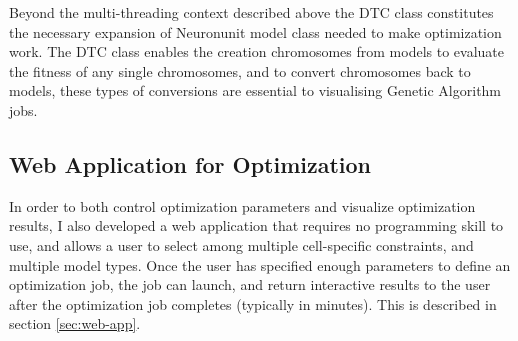 Beyond the multi-threading context described above the DTC class constitutes the necessary expansion of Neuronunit model class needed to make optimization work. The DTC class enables the creation chromosomes from models to evaluate the fitness of any single chromosomes, and to convert chromosomes back to models, these types of conversions are essential to visualising Genetic Algorithm jobs.%






% 

\subsection{Web Application for Optimization}
In order to both control optimization parameters and visualize optimization results, I also developed a web application that requires no programming skill to use, and allows a user to select among multiple cell-specific constraints, and multiple model types.
Once the user has specified enough parameters to define an optimization job, the job can launch, and return interactive results to the user after the optimization job completes (typically in minutes).
This is described in section \ref{sec:web-app}.